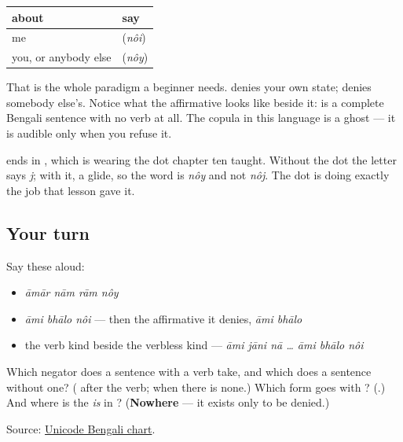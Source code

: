 \begin{grammarlens}[title={Grammar Lens: the form follows the person}]
\noindent
\begin{tabularx}{\linewidth}{@{}>{\raggedright\arraybackslash}X>{\raggedright\arraybackslash}X@{}}
\toprule
\textbf{about} & \textbf{say} \\
\midrule
me & \textbf{\bn{নই}} (\emph{nôi}) \\
you, or anybody else & \textbf{\bn{নয়}} (\emph{nôy}) \\
\bottomrule
\end{tabularx}

That is the whole paradigm a beginner needs. \textbf{  } denies your own state; \textbf{  } denies somebody else's. Notice what the affirmative looks like beside it: \textbf{ } is a complete Bengali sentence with no verb at all. The copula in this language is a ghost — it is audible only when you refuse it.
\end{grammarlens}

\begin{sounds}
\textbf{} ends in \textbf{}, which is \textbf{} wearing the dot chapter ten taught. Without the dot the letter says \emph{j}; with it, a glide, so the word is \emph{nôy} and not \emph{nôj}. The dot is doing exactly the job that lesson gave it.
\end{sounds}

\subsection*{Your turn}
Say these aloud:

\begin{itemize}
\raggedright
  \item \emph{āmār nām rām nôy}
  \item \emph{āmi bhālo nôi} — then the affirmative it denies, \emph{āmi bhālo}
  \item the verb kind beside the verbless kind — \emph{āmi jāni nā … āmi bhālo nôi}
\end{itemize}

\begin{tcolorbox}[breakable,colback=teal!4,colframe=teal!35!black,title={Before you move on}]
Which negator does a sentence with a verb take, and which does a sentence without one? (\textbf{} after the verb; \textbf{} when there is none.) Which form goes with \textbf{}? (\textbf{}.) And where is the \emph{is} in \textbf{ }? (\textbf{Nowhere} — it exists only to be denied.)

Source: \href{https://www.unicode.org/charts/PDF/U0980.pdf}{Unicode Bengali chart}.
\end{tcolorbox}
